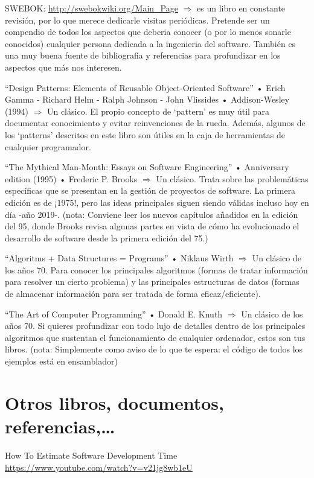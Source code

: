 \documentclass[spanish,12pt,a4paper,final,oneside]{book}
\begin{document}
SWEBOK:  \url{http://swebokwiki.org/Main_Page} $\Rightarrow$ es un libro en constante revisión, por lo que merece dedicarle visitas periódicas. Pretende ser un compendio de todos los aspectos que deberia conocer (o por lo menos sonarle conocidos) cualquier persona dedicada a la ingenieria del software. También es una muy buena fuente de bibliografia y referencias para profundizar en los aspectos que más nos interesen.

``Design Patterns: Elements of Reusable Object-Oriented Software'' • Erich Gamma - Richard Helm - Ralph Johnson - John Vlissides • Addison-Wesley (1994)  $\Rightarrow$ Un clásico. El propio concepto de ‘pattern’ es muy útil para documentar conocimiento y evitar reinvenciones de la rueda. Además, algunos de los ‘patterns’ descritos en este libro son útiles en la caja de herramientas de cualquier programador.

``The Mythical Man-Month: Essays on Software Engineering'' • Anniversary edition (1995) • Frederic P. Brooks $\Rightarrow$ Un clásico. Trata sobre las problemáticas específicas que se presentan en la gestión de proyectos de software. La primera edición es de ¡1975!, pero las ideas principales siguen siendo válidas incluso hoy en día -año 2019-. (nota: Conviene leer los nuevos capítulos añadidos en la edición del 95, donde Brooks revisa algunas partes en vista de cómo ha evolucionado el desarrollo de software desde la primera edición del 75.)

``Algoritms + Data Structures = Programs'' • Niklaus Wirth  $\Rightarrow$ Un clásico de los años 70. Para conocer los principales algoritmos (formas de tratar información para resolver un cierto problema) y las principales estructuras de datos (formas de almacenar información para ser tratada de forma eficaz/eficiente).

``The Art of Computer Programming'' • Donald E. Knuth  $\Rightarrow$ Un clásico de los años 70. Si quieres profundizar con todo lujo de detalles dentro de los principales algoritmos que sustentan el funcionamiento de cualquier ordenador, estos son tus libros. (nota: Simplemente como aviso de lo que te espera: el código de todos los ejemplos está en ensamblador)

\section{Otros libros, documentos, referencias,\ldots}

How To Estimate Software Development Time
\\ \url{https://www.youtube.com/watch?v=v21jg8wb1eU}
\end{document}
